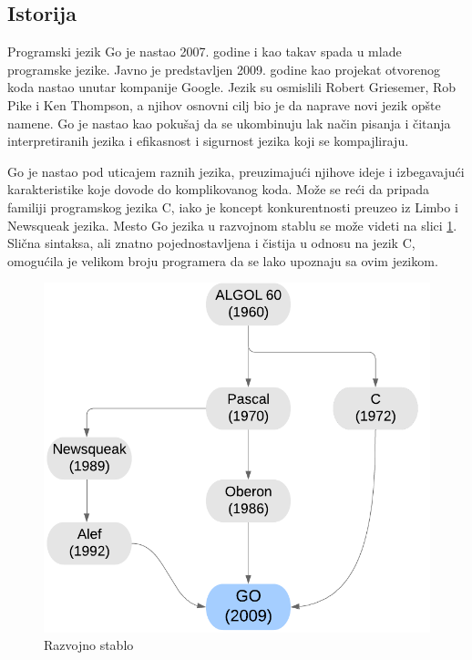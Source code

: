 \documentclass[a4paper]{article}
\begin{document}
\subsection{Istorija}
\label{subsec:istorija}

Programski jezik Go je nastao 2007. godine i kao takav spada u mlade programske jezike. Javno je predstavljen 2009. godine kao projekat otvorenog koda nastao unutar kompanije Google. Jezik su osmislili Robert Griesemer, Rob Pike i Ken Thompson, a njihov osnovni cilj bio je da naprave novi jezik opšte namene. Go je nastao kao pokušaj da se ukombinuju lak način pisanja i čitanja interpretiranih jezika i efikasnost i sigurnost jezika koji se kompajliraju.

Go je nastao pod uticajem raznih jezika, preuzimajući njihove ideje i izbegavajući karakteristike koje dovode do komplikovanog koda. Može se reći da pripada familiji programskog jezika C, iako je koncept konkurentnosti preuzeo iz Limbo i Newsqueak jezika. Mesto Go jezika u razvojnom stablu se može videti na slici \ref{fig:razvojno_stablo}. Slična sintaksa, ali znatno pojednostavljena i čistija u odnosu na jezik C, omogućila je velikom broju programera da se lako upoznaju sa ovim jezikom. \cite{TheGoProgramingLanguage}

\begin{figure}[htbp]
\begin{center}
    \includegraphics[scale=0.4]{razvojno_drvo.png}
    \caption{Razvojno stablo}
    \label{fig:razvojno_stablo}
\end{center}
\end{figure}
\end{document}
